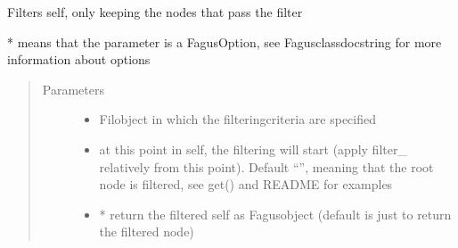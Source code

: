 \documentclass[a4paper,10pt,english]{sphinxmanual}
\begin{document}
\begin{fulllineitems}
\begin{fulllineitems}
\label{\detokenize{fagus:fagus.Fagus.filter}}
\pysigstartsignatures
{}
\pysigstopsignatures
\sphinxAtStartPar
Filters self, only keeping the nodes that pass the filter

\sphinxAtStartPar
* means that the parameter is a FagusOption, see Fagus\sphinxhyphen{}class\sphinxhyphen{}docstring for more information about options
\begin{quote}\begin{description}
\item[{Parameters}] \leavevmode\begin{itemize}
\item {}
\sphinxAtStartPar
{} \textendash{} Fil\sphinxhyphen{}object in which the filtering\sphinxhyphen{}criteria are specified

\item {}
\sphinxAtStartPar
{} \textendash{} at this point in self, the filtering will start (apply filter\_ relatively from this point).
Default “”, meaning that the root node is filtered, see get() and README for examples

\item {}
\sphinxAtStartPar
{} \textendash{} * return the filtered self as Fagus\sphinxhyphen{}object (default is just to return the filtered node)


\end{itemize}
\end{description}
\end{quote}
\end{fulllineitems}
\end{fulllineitems}
\end{document}
